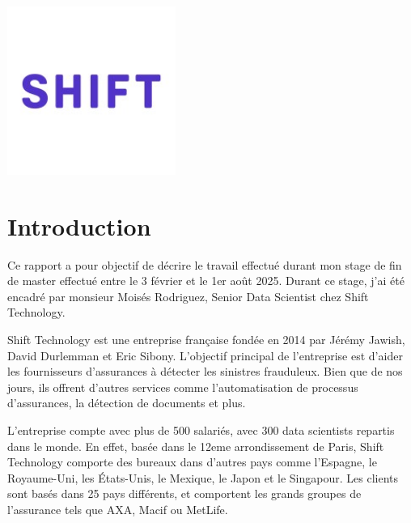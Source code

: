 \documentclass [twoside,openright,a4paper,11pt,french] {report}
\begin{document}
\begin{center}
    \includegraphics [height=5.5cm] {logo-entreprise.jpeg}       

    


\end{center}



{
    \parskip=0pt
    \tableofcontents
}

\cleardoublepage


\chapter {Introduction}
    \label {chap:intro}

Ce rapport a pour objectif de décrire le travail effectué durant mon stage de 
fin de master effectué entre le 3 février et le 1er août 2025. Durant ce stage,
j'ai été encadré par monsieur Moisés Rodriguez, Senior Data Scientist chez Shift Technology.

Shift Technology est une entreprise française fondée en 2014 par Jérémy Jawish, 
David Durlemman et Eric Sibony. L'objectif principal de l'entreprise est d'aider les fournisseurs
d'assurances à détecter les sinistres frauduleux. Bien que de nos jours, ils offrent d'autres 
services comme l'automatisation de processus d'assurances, la détection de documents 
et plus. 

L'entreprise compte avec plus de 500 salariés, avec 300 data scientists repartis dans le monde. En effet, basée 
dans le 12eme arrondissement de Paris, Shift Technology comporte des bureaux dans d'autres
pays comme l'Espagne, le Royaume-Uni, les États-Unis, le Mexique, le Japon et le Singapour. Les clients sont basés
dans 25 pays différents, et comportent les grands groupes de l'assurance tels que AXA, Macif ou MetLife. 
\end{document}
